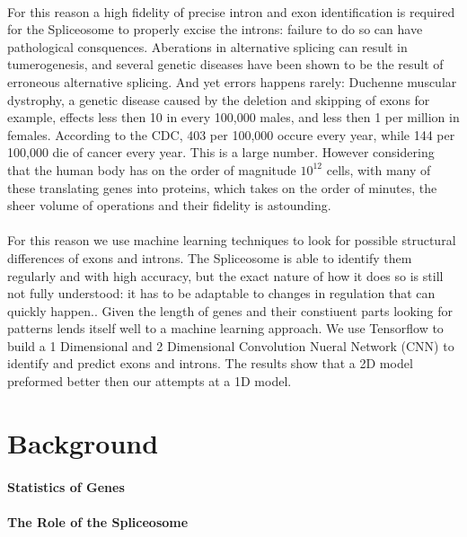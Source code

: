 \documentclass[12pt]{article}
\begin{document}
\paragraph*{}
For this reason a high fidelity of precise intron and exon identification is required for the Spliceosome to properly excise the introns: failure to do so can have pathological consquences. Aberations in alternative splicing can result in tumerogenesis\cite{zhang2021alternative}, and several genetic diseases have been shown to be the result of erroneous alternative splicing\cite{scotti2016rna}.
And yet errors happens rarely: Duchenne muscular dystrophy, a genetic disease caused by the deletion and skipping of exons for example, effects less then 10 in every 100,000 males, and less then 1 per million in females\cite{duan2021duchenne}.
According to the CDC, 403 per 100,000 occure every year, while 144 per 100,000 die of cancer every year.
This is a large number. However considering that the human body has on the order of magnitude $10^{12}$ cells, with many of these translating genes into proteins, which takes on the order of minutes, the sheer volume of operations and their fidelity is astounding.
\paragraph*{}
For this reason we use machine learning techniques to look for possible structural differences of exons and introns.
The Spliceosome is able to identify them regularly and with high accuracy, but the exact nature of how it does so is still not fully understood: it has to be adaptable to changes in regulation that can quickly happen.\cite{wahl2009spliceosome}\cite{will2011spliceosome}.
Given the length of genes and their constiuent parts looking for patterns lends itself well to a machine learning approach.
We use Tensorflow to build a 1 Dimensional and 2 Dimensional Convolution Nueral Network (CNN) to identify and predict exons and introns.
The results show that a 2D model preformed better then our attempts at a 1D model.
\section{Background}
\paragraph*{Statistics of Genes}
\paragraph*{The Role of the Spliceosome}
\end{document}

